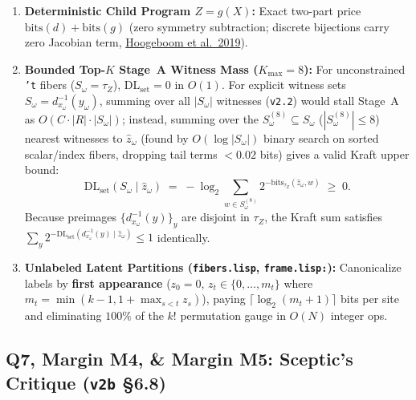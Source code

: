 \documentclass[12pt]{article}
\newcommand{\litref}[2]{\hyperlink{lit:#1}{\textcolor{citegreen}{#2}}}
\begin{document}
\begin{enumerate}[leftmargin=1.6em, itemsep=0.18em]
  \item \textbf{Deterministic Child Program $Z = g(X)$:} Exact two-part price $\mathrm{bits}(d) + \mathrm{bits}(g)$ (zero symmetry subtraction; discrete bijections carry zero Jacobian term, \litref{hoogeboom2019}{Hoogeboom et al.\ 2019}).
  \item \textbf{Bounded Top-$K$ Stage~A Witness Mass ($K_{\max}=8$):} For unconstrained \texttt{'t} fibers ($S_\omega = \tau_Z$), $\mathrm{DL}_{\mathrm{set}} = 0$ in $O(1)$. For explicit witness sets $S_\omega = d_{x_\omega}^{-1}(y_\omega)$, summing over all $|S_\omega|$ witnesses (\texttt{v2.2}) would stall Stage~A as $O(C\cdot|R|\cdot|S_\omega|)$; instead, summing over the $S_\omega^{(8)} \subseteq S_\omega$ ($|S_\omega^{(8)}|\le 8$) nearest witnesses to $\hat{z}_\omega$ (found by $O(\log|S_\omega|)$ binary search on sorted scalar/index fibers, dropping tail terms $<0.02$ bits) gives a valid Kraft upper bound:
  \begin{equation}\label{eq:witness-mass}
    \mathrm{DL}_{\mathrm{set}}(S_\omega \mid \hat{z}_\omega) \;=\; -\log_2 \sum_{w \in S_\omega^{(8)}} 2^{-\mathrm{bits}_{\tau_Z}(\hat{z}_\omega, w)} \;\ge\; 0.
  \end{equation}
  Because preimages $\{d_{x_\omega}^{-1}(y)\}_y$ are disjoint in $\tau_Z$, the Kraft sum satisfies $\sum_y 2^{-\mathrm{DL}_{\mathrm{set}}(d_{x_\omega}^{-1}(y)\mid \hat{z}_\omega)} \le 1$ identically.
  \item \textbf{Unlabeled Latent Partitions (\texttt{fibers.lisp}, \texttt{frame.lisp:}):} Canonicalize labels by \textbf{first appearance} ($z_0 = 0$, $z_t \in \{0,\dots,m_t\}$ where $m_t = \min(k-1, 1 + \max_{s<t} z_s)$), paying $\lceil \log_2(m_t + 1)\rceil$ bits per site and eliminating $100\%$ of the $k!$ permutation gauge in $O(N)$ integer ops.
\end{enumerate}

\subsection{Q7, Margin M4, \& Margin M5: Sceptic's Critique (\texttt{v2b} \S6.8)}
\label{ans:7}
\end{document}
